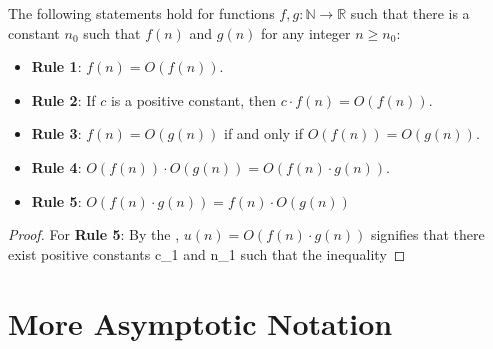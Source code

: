 \begin{theorem}
    The following statements hold for functions $f,g: \mathbb{N} \rightarrow \mathbb{R}$ such that there is a constant $n_0$ such that $f(n)$ and $g(n)$ for any integer $n \geq n_0$:
    \begin{itemize}
        \item \textbf{Rule 1}: $f(n) = O(f(n))$.
        \item \textbf{Rule 2}: If $c$ is a positive constant, then $c \cdot f(n) = O(f(n))$.
        \item \textbf{Rule 3}: $f(n) = O(g(n))$ if and only if $O(f(n)) = O(g(n))$.
        \item \textbf{Rule 4}: $O(f(n)) \cdot O(g(n)) = O(f(n) \cdot g(n))$.
        \item \textbf{Rule 5}: $O(f(n) \cdot g(n)) = f(n) \cdot O(g(n))$
    \end{itemize}
\end{theorem}
\begin{proof}
    For \textbf{Rule 5}: By the , $u(n) = O(f(n) \cdot g(n))$ signifies that there exist positive constants c_1 and n_1 such that the inequality
\end{proof}

\section{More Asymptotic Notation}

